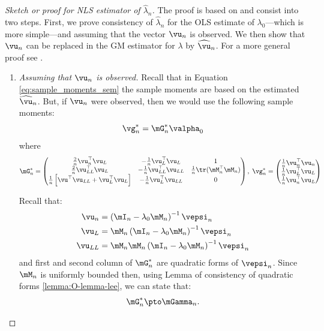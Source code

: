 \documentclass[english,12pt]{book}\usepackage[]{graphicx}\usepackage[]{xcolor}
\begin{document}
\begin{proof}[Sketch or proof for NLS estimator of $\widehat{\lambda}_n$]
The proof is based on \cite{kelejian2017spatial} and consist into two steps. First, we prove consistency of $\widehat{\lambda}_n$ for the OLS estimate of $\lambda_0$---which is more simple---and assuming that the vector $\vu_n$ is observed. We then show that $\vu_n$ can be replaced in the GM estimator for $\lambda$ by $\widehat{\vu}_n$. For a more general proof see \citet{kelejian1998generalized, kelejian1999generalized}.
\begin{enumerate}
  \item \emph{Assuming that $\vu_n$ is observed.} Recall that in Equation \eqref{eq:sample_moments_sem} the sample moments are based on the estimated $\widehat{\vu}_n$. But, if $\vu_n$ were observed, then we would use the following sample moments:
\begin{equation*}
  \vg_n^* = \mG_n^*\valpha_0
\end{equation*}
%
where 
\begin{equation*}
  \mG_n^* = \begin{pmatrix}
   \frac{2}{n}\vu^\top_n\vu_L & -\frac{1}{n}\vu_L^\top\vu_L & 1\\
   \frac{2}{n}\vu^\top_{LL}\vu_L & -\frac{1}{n}\vu_{LL}^\top\vu_{LL} & \frac{1}{n} \tr(\mM^\top_n\mM_n)\\
   \frac{1}{n}\left[\vu^\top\vu_{LL} + \vu_L^\top\vu_L\right] & -\frac{1}{n}\vu_{L}^\top\vu_{LL} & 0
        \end{pmatrix},\; 
  \vg_n^* = \begin{pmatrix}
  \frac{1}{n}\vu^\top_n\vu_n \\
  \frac{1}{n}\vu^\top_L\vu_L \\
  \frac{1}{n}\vu^\top_n\vu_L
        \end{pmatrix}
\end{equation*}

Recall that:
\begin{equation*}
  \begin{aligned}
    \vu_n    & = \left(\mI_n - \lambda_0\mM_n\right)^{-1}\vepsi_n \\
    \vu_L    & = \mM_n\left(\mI_n - \lambda_0\mM_n\right)^{-1}\vepsi_n \\
    \vu_{LL} & = \mM_n\mM_n\left(\mI_n - \lambda_0\mM_n\right)^{-1}\vepsi_n
  \end{aligned}
\end{equation*}
%
and first and second column of $\mG^*_n$ are quadratic forms of $\vepsi_n$. Since $\mM_n$ is uniformly bounded then, using Lemma of consistency of quadratic forms \ref{lemma:O-lemma-lee}, we can state that:
\begin{equation*}
\mG^*_n\pto \mGamma_n.
\end{equation*}


\end{enumerate}
\end{proof}
\end{document}
